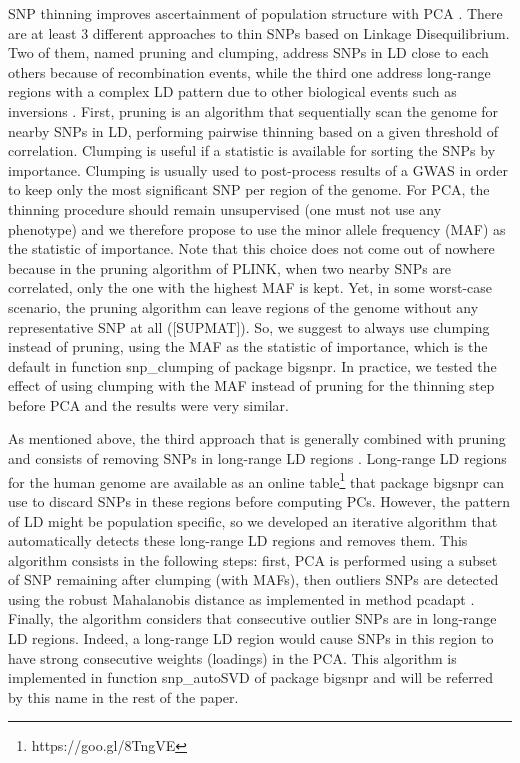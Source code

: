 \documentclass{bioinfo}
\begin{document}
\begin{methods}
SNP thinning improves ascertainment of population structure with PCA \cite[]{Abdellaoui2013}. There are at least 3 different approaches to thin SNPs based on Linkage Disequilibrium. Two of them, named pruning and clumping, address SNPs in LD close to each others because of recombination events, while the third one address long-range regions with a complex LD pattern due to other biological events such as inversions \cite[]{Price2008}. 
First, pruning is an algorithm that sequentially scan the genome for nearby SNPs in LD, performing pairwise thinning based on a given threshold of correlation.
{\color{red}
Clumping is useful if a statistic is available for sorting the SNPs by importance. Clumping is usually used to post-process results of a GWAS in order to keep only the most significant SNP per region of the genome. 
For PCA, the thinning procedure should remain unsupervised (one must not use any phenotype) and we therefore propose to use the minor allele frequency (MAF) as the statistic of importance. 
Note that this choice does not come out of nowhere because in the pruning algorithm of PLINK, when two nearby SNPs are correlated, only the one with the highest MAF is kept.
Yet, in some worst-case scenario, the pruning algorithm can leave regions of the genome without any representative SNP at all ([SUPMAT]). 
So, we suggest to always use clumping instead of pruning, using the MAF as the statistic of importance, which is the default in function snp\_clumping of package bigsnpr. In practice, we tested the effect of using clumping with the MAF instead of pruning for the thinning step before PCA and the results were very similar.
}

As mentioned above, the third approach that is generally combined with pruning and consists of removing SNPs in long-range LD regions \cite[]{Price2008}. Long-range LD regions for the human genome are available as an online table\footnote{https://goo.gl/8TngVE} that package bigsnpr can use to discard SNPs in these regions before computing PCs. 
However, the pattern of LD might be population specific, so we developed an iterative algorithm that automatically detects these long-range LD regions and removes them. This algorithm consists in the following steps: first, PCA is performed using a subset of SNP remaining after clumping (with MAFs), then outliers SNPs are detected using the robust Mahalanobis distance as implemented in method pcadapt \cite[]{Luu2017}. Finally, the algorithm considers that consecutive outlier SNPs are in long-range LD regions. Indeed, a long-range LD region would cause SNPs in this region to have strong consecutive weights (loadings) in the PCA. This algorithm is implemented in function snp\_autoSVD of package bigsnpr and will be referred by this name in the rest of the paper.



\end{methods}
\end{document}
